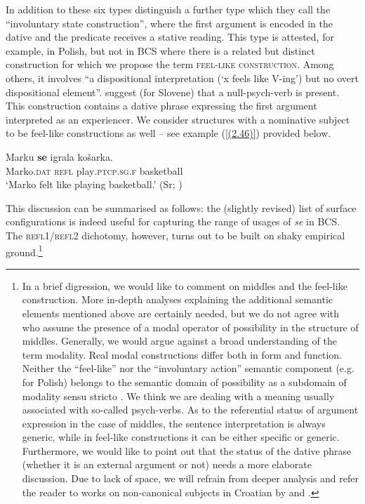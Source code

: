 \noindent In addition to these six types \citet{FJL10} distinguish a further type which they call the ``involuntary state construction'', where the first argument is encoded in the dative and the predicate receives a stative reading. This type is attested, for example, in Polish, but not in BCS where there is a related but distinct construction for which we propose the term \textsc{feel-like construction}. Among others, it involves ``a dispositional interpretation (`x feels like V-ing') but no overt dispositional element''. \citet{MarusicZaucer06} suggest (for Slovene) that a null-psych-verb is present. This construction contains a dative phrase expressing the first argument interpreted as an experiencer. We consider structures with a nominative subject to be feel-like constructions as well – see example (\ref{(2.46)}) provided below.

\begin{exe}\ex\label{(2.46)}
\gll Marku \textbf{se} igrala košarka.\\
 Marko\textsc{.dat} \textsc{refl} play\textsc{.ptcp.sg.f} basketball\\
\glt ‘Marko felt like playing basketball.’ 
\hfill (Sr; \citealt[249]{StanojcicPopovic02})
\end{exe}

\noindent This discussion can be summarised as follows: the (slightly revised) list of surface configurations is indeed useful for capturing the range of usages of \textit{se} in BCS. The \textsc{refl1}/\textsc{refl2} dichotomy, however, turns out to be built on shaky empirical ground.\footnote{In a brief digression, we would like to comment on middles and the feel-like construction. More in-depth analyses explaining the additional semantic elements mentioned above are certainly needed, but we do not agree with \citet[228]{FJL10} who assume the presence of a modal operator of possibility in the structure of middles. Generally, we would argue against a broad understanding of the term modality. Real modal constructions differ both in form and function. Neither the ``feel-like'' nor the ``involuntary action'' semantic component (e.g. for Polish) belongs to the semantic domain of possibility as a subdomain of modality sensu stricto \citep[cf.][]{AuweraPlungian98}. We think we are dealing with a meaning usually associated with so-called psych-verbs. As to the referential status of argument expression in the case of middles, the sentence interpretation is always generic, while in feel-like constructions it can be either specific or generic. Furthermore, we would like to point out that the status of the dative phrase (whether it is an external argument or not) needs a more elaborate discussion. Due to lack of space, we will refrain from deeper analysis and refer the reader to works on non-canonical subjects in Croatian by \citet{Kucanda98} and \citet*{HWK18}.}

